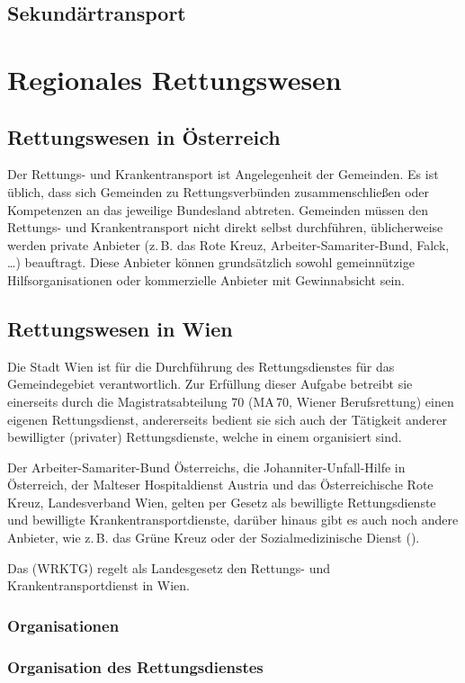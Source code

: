 {\TakeNotesLarge}

\subsection{Sekundärtransport}

{\TakeNotesLarge}

\section{Regionales Rettungswesen}

{\TakeNotesLarge}

\subsection{Rettungswesen in Österreich}

Der Rettungs- und Krankentransport ist Angelegenheit der Gemeinden. Es ist
üblich, dass sich Gemeinden zu Rettungsverbünden zusammenschließen oder
Kompetenzen an das jeweilige Bundesland abtreten.  Gemeinden müssen den
Rettungs- und Krankentransport nicht direkt selbst durchführen, üblicherweise
werden private Anbieter (z.\,B. das Rote Kreuz, Arbeiter-Samariter-Bund, Falck,
\ldots{}) beauftragt. Diese Anbieter können grundsätzlich sowohl gemeinnützige
Hilfsorganisationen oder kommerzielle Anbieter mit Gewinnabsicht sein.


\subsection{Rettungswesen in Wien}

Die Stadt Wien ist für die Durchführung des Rettungsdienstes für das
Gemeindegebiet verantwortlich. Zur Erfüllung dieser Aufgabe betreibt sie
einerseits durch die Magistratsabteilung 70 (MA\,70, Wiener Berufsrettung) 
einen eigenen Rettungsdienst, andererseits bedient sie
sich auch der Tätigkeit anderer bewilligter (privater) Rettungsdienste, welche
in einem  organisiert sind.




Der Arbeiter-Samariter-Bund Österreichs, die Johanniter-Unfall-Hilfe in
Österreich, der Malteser Hospitaldienst Austria und das Österreichische Rote
Kreuz, Landesverband Wien, gelten per Gesetz als bewilligte Rettungsdienste und
bewilligte Krankentransportdienste, darüber hinaus gibt es auch noch andere
Anbieter, wie z.\,B. das Grüne Kreuz oder der Sozialmedizinische Dienst
().

Das  (WRKTG) regelt als
Landesgesetz den Rettungs- und Krankentransportdienst in Wien. 

{\TakeNotesLarge}

\subsubsection{Organisationen}

{\TakeNotesLarge}

\subsubsection{Organisation des Rettungsdienstes}

{\TakeNotesLarge}


